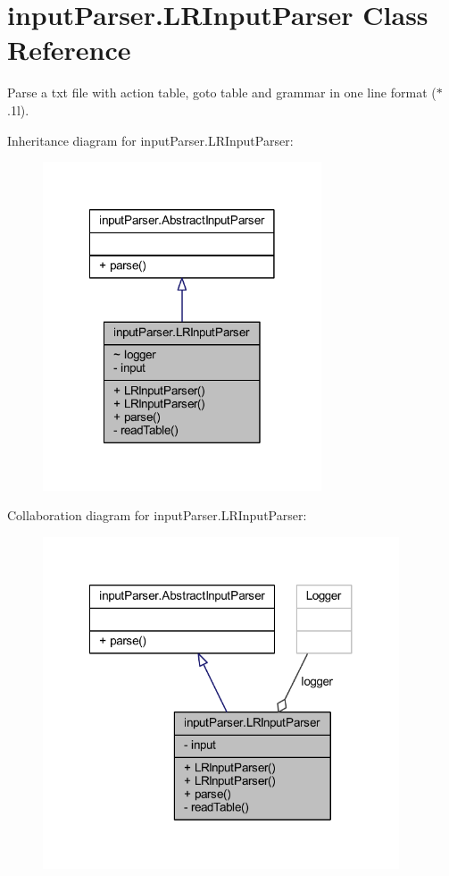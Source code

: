 \hypertarget{classinput_parser_1_1_l_r_input_parser}{\section{input\-Parser.\-L\-R\-Input\-Parser Class Reference}
\label{classinput_parser_1_1_l_r_input_parser}
}


Parse a txt file with action table, goto table and grammar in one line format ($\ast$.1l).  




Inheritance diagram for input\-Parser.\-L\-R\-Input\-Parser\-:\nopagebreak
\begin{figure}[H]
\begin{center}
\leavevmode
\includegraphics[width=234pt]{classinput_parser_1_1_l_r_input_parser__inherit__graph}
\end{center}
\end{figure}


Collaboration diagram for input\-Parser.\-L\-R\-Input\-Parser\-:\nopagebreak
\begin{figure}[H]
\begin{center}
\leavevmode
\includegraphics[width=299pt]{classinput_parser_1_1_l_r_input_parser__coll__graph}
\end{center}
\end{figure}
